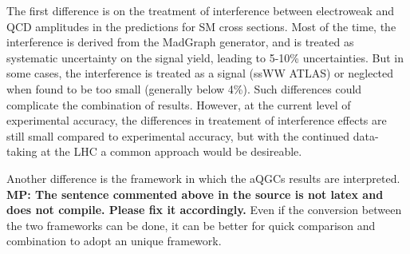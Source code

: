 

The first difference is on the treatment of interference between electroweak and QCD amplitudes in the predictions for SM cross sections. Most of the time, the interference is derived from the MadGraph generator, and is treated as systematic uncertainty on the signal yield, leading to 5-10\% uncertainties. But in some cases, the interference is treated as a signal (ssWW ATLAS) or neglected when found to be too small (generally below 4\%). Such differences could complicate the combination of results.
However, at the current level of experimental accuracy, the differences in treatement of interference effects are still small compared to experimental accuracy, but with the continued data-taking at the LHC a common approach would be desireable.

Another difference is the framework in which the aQGCs results are interpreted.
{\bf MP: The sentence commented above in the source is not latex and does not compile. Please fix it accordingly.}
Even if the conversion between the two frameworks can be done, it can be better for quick comparison and combination to adopt an unique framework.

